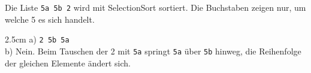 \question[3]
Die Liste \texttt{5a 5b 2} wird mit SelectionSort sortiert. Die Buchstaben zeigen nur, um welche 5 es sich handelt.
\begin{solutionbox}{2.5cm}
a) \texttt{2 5b 5a} \\
b) Nein. Beim Tauschen der 2 mit \texttt{5a} springt \texttt{5a} über \texttt{5b} hinweg, die Reihenfolge der gleichen Elemente ändert sich.
\end{solutionbox}
